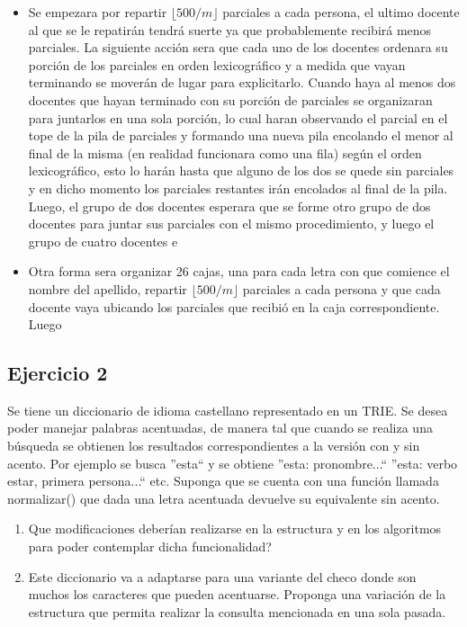 \documentclass[10pt, a4paper]{article}
\begin{document}
\begin{itemize}
 \item Se empezara por repartir $\lfloor500/m\rfloor$ parciales a cada persona, el ultimo docente al que se le repatir\'an tendr\'a suerte ya que probablemente recibir\'a menos parciales. La siguiente acci\'on sera que cada uno de los docentes ordenara su porci\'on de los parciales en orden lexicogr\'afico y a medida que vayan terminando se mover\'an de lugar para explicitarlo. Cuando haya al menos dos docentes que hayan terminado con su porci\'on de parciales se organizaran para juntarlos en una sola porci\'on, lo cual haran observando el parcial en el tope de la pila de parciales y formando una nueva pila encolando el menor al final de la misma (en realidad funcionara como una fila) seg\'un el orden lexicogr\'afico, esto lo har\'an hasta que alguno de los dos se quede sin parciales y en dicho momento los parciales restantes ir\'an encolados al final de la pila. Luego, el grupo de dos docentes esperara que se forme otro grupo de dos docentes para juntar sus parciales con el mismo procedimiento, y luego el grupo de cuatro docentes e
 
 \item Otra forma sera organizar 26 cajas, una para cada letra con que comience el nombre del apellido, repartir $\lfloor500/m\rfloor$ parciales a cada persona y que cada docente vaya ubicando los parciales que recibi\'o en la caja correspondiente. Luego
\end{itemize}


\subsection*{Ejercicio 2}

Se tiene un diccionario de idioma castellano representado en un TRIE. Se desea poder manejar palabras acentuadas, de manera tal que cuando se realiza una b\'usqueda se obtienen los resultados correspondientes a la versi\'on con y sin acento. Por ejemplo se busca ''esta`` y se obtiene ''esta: pronombre...`` ''esta: verbo estar, primera persona...`` etc. Suponga que se cuenta con una funci\'on llamada normalizar() que dada una letra acentuada devuelve su equivalente sin acento.

\begin{enumerate}
 \item Que modificaciones deber\'ian realizarse en la estructura y en los algoritmos para poder contemplar dicha funcionalidad?
 \item Este diccionario va a adaptarse para una variante del checo donde son muchos los caracteres que pueden acentuarse. Proponga una variaci\'on de la estructura que permita realizar la consulta mencionada en una sola pasada.
\end{enumerate}
\end{document}
